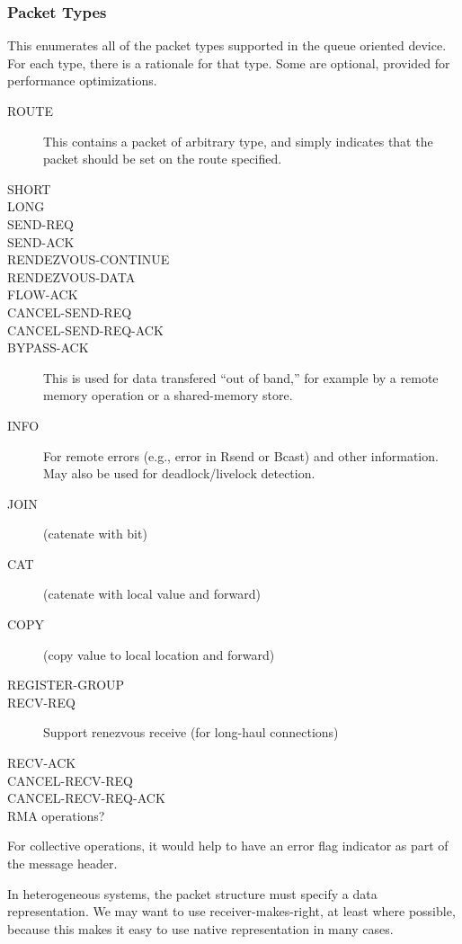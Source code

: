 \documentclass{article}
\begin{document}
\subsubsection{Packet Types}
This enumerates all of the packet types supported in the queue oriented
device.  For each type, there is a rationale for that type.  Some are
optional, provided for performance optimizations.

\begin{description}
\item[ROUTE]This contains a packet of arbitrary type, and simply indicates
  that the packet should be set on the route specified.
\item[SHORT]
\item[LONG]
\item[SEND-REQ]
\item[SEND-ACK]
\item[RENDEZVOUS-CONTINUE]
\item[RENDEZVOUS-DATA]
\item[FLOW-ACK]
\item[CANCEL-SEND-REQ]
\item[CANCEL-SEND-REQ-ACK]
\item[BYPASS-ACK]This is used for data transfered ``out of band,'' for example
  by a remote memory operation or a shared-memory store.
\item[INFO]For remote errors (e.g., error in Rsend or Bcast) and other
  information.  May also be used for deadlock/livelock detection.

\item[JOIN](catenate with bit)
\item[CAT](catenate with local value and forward)
\item[COPY](copy value to local location and forward)
\item[REGISTER-GROUP]

\item[RECV-REQ]Support renezvous receive (for long-haul connections)
\item[RECV-ACK]
\item[CANCEL-RECV-REQ]
\item[CANCEL-RECV-REQ-ACK]

\item[RMA operations?]
\end{description}

For collective operations, it would help to have an error flag indicator as
part of the message header.

In heterogeneous systems, the packet structure must specify a data
representation.  We may want to use receiver-makes-right, at least where
possible, because this makes it easy to use native representation in many
cases.  
\end{document}
